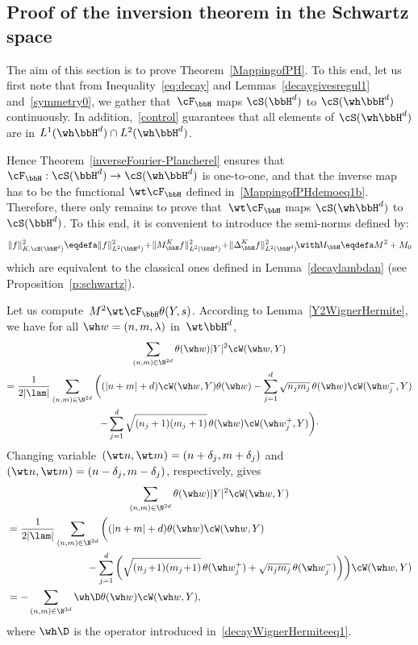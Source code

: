\subsection{Proof of the inversion theorem in the Schwartz space}

The aim of this section is to prove Theorem~\ref{MappingofPH}. To this end, let us first note that from Inequality~\eqref{eq:decay} and Lemmas~\ref{decaygivesregul1} and~\ref{symmetry0}, we gather that~$\cF_\bbH$ maps $\cS(\bbH^d)$ to $\cS(\wh\bbH^d)$ continuously. In addition,~\eqref{control} guarantees that all elements of $\cS(\wh\bbH^d)$ are in $L^1(\wh\bbH^d)\cap L^2(\wh\bbH^d)$.

Hence Theorem~\ref{inverseFourier-Plancherel} ensures that $\cF_\bbH: \cS(\bbH^d)\to\cS(\wh\bbH^d)$ is one-to-one, and that the inverse map has to be the functional $\wt\cF_\bbH$ defined in~\eqref{MappingofPHdemoeq1b}. Therefore, there only remains to prove that~$\wt\cF_\bbH$ maps $\cS(\wh\bbH^d)$ to $\cS(\bbH^d)$. To this end, it is convenient to introduce the semi-norms defined by:
\begin{equation}\label{def:sn}
\| f \|_{K,\cS(\bbH^d)}^2 \eqdefa \|f\|_{L^2(\bbH^d)}^2 \!+\!\| M_\bbH^K f\|_{L^2(\bbH^d)}^2\!+\!\|\Delta_\bbH^K f\|_{L^2(\bbH^d)}^2
\!\with\! M_\bbH\eqdefa M^2+M_0
\end{equation}
which are equivalent to the classical ones defined in Lemma~\ref{decaylambdan} (see Proposition~\ref{p:schwartz}).

Let us compute~$M^2\wt\cF_\bbH \theta (Y,s)$. According to Lemma~\ref{Y2WignerHermite}, we have for all $\wh w=(n,m,\lambda)$ in~$\wt\bbH^d$,
\begin{multline*}
\sum_{(n,m)\in \N^{2d} } \theta(\wh w) |Y|^2\cW (\wh w, Y)\\
=\frac 1 {2|\lam|}\sum_{(n,m)\in \N^{2d}}\bigg((|n+m| +d) \cW(\wh w, Y)\theta(\wh w)  - \sum_{j=1}^d \sqrt {n_jm_j} \, \theta(\wh w) \cW(\wh w_j^-, Y)\\
- \sum_{j=1}^d \sqrt {(n_j+1)(m_j+1)} \,\theta (\wh w) \cW(\wh w_j^+, Y)\bigg)\cdotp
\end{multline*}
Changing variable~$(\wt n,\wt m) = (n+\delta_j,m+\delta_j)$ and~$(\wt n,\wt m) = (n-\delta_j,m-\delta_j)$, respectively, gives
\begin{multline*}
\sum_{(n,m)\in \N^{2d} } \theta(\wh w) |Y|^2\cW (\wh w, Y)\\
\begin{aligned}
& =\frac 1 {2|\lam|} \sum_{(n,m)\in \N^{2d} }\bigg((|n+m| +d)\theta(\wh w) \cW(\wh w, Y)\\
&\mkern 140mu - \sum_{j=1}^d \left(\sqrt {(n_j\!+\!1)(m_j\!+\!1)} \,\theta (\wh w_j^+) + \sqrt {n_jm_j} \, \theta(\wh w_j^-)\right)\!\bigg) \cW(\wh w, Y)\\
&= -\sum_{(n,m)\in \N^{2d} } \wh \D \theta (\wh w) \cW(\wh w, Y),
\end{aligned}
\end{multline*}
where $\wh \D$ is the operator introduced in~\eqref{decayWignerHermiteeq1}.

